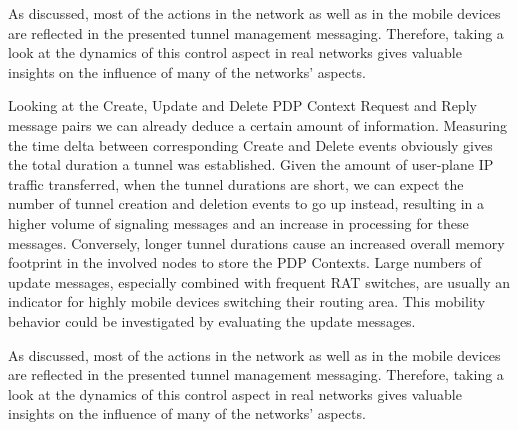 As discussed, most of the actions in the network as well as in the mobile devices are reflected in the presented tunnel management messaging. Therefore, taking a look at the dynamics of this control aspect in real networks gives valuable insights on the influence of many of the networks' aspects.

Looking at the Create, Update and Delete \gls{PDP} Context Request and Reply message pairs we can already deduce a certain amount of information. Measuring the time delta between corresponding Create and Delete events obviously gives the total duration a tunnel was established. Given the amount of user-plane IP traffic transferred, when the tunnel durations are short, we can expect the number of tunnel creation and deletion events to go up instead, resulting in a higher volume of signaling messages and an increase in processing for these messages. Conversely, longer tunnel durations cause an increased overall memory footprint in the involved nodes to store the \gls{PDP} Contexts. Large numbers of update messages, especially combined with frequent \gls{RAT} switches, are usually an indicator for highly mobile devices switching their routing area. This mobility behavior could be investigated by evaluating the update messages.

As discussed, most of the actions in the network as well as in the mobile devices are reflected in the presented tunnel management messaging. Therefore, taking a look at the dynamics of this control aspect in real networks gives valuable insights on the influence of many of the networks' aspects.






